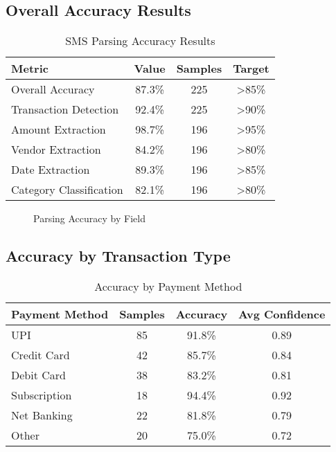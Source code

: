 \documentclass[11pt,a4paper]{report}
\begin{document}
\subsection{Overall Accuracy Results}

\begin{table}[H]
\centering
\caption{SMS Parsing Accuracy Results}
\begin{tabular}{|l|c|c|c|}
\hline
\textbf{Metric} & \textbf{Value} & \textbf{Samples} & \textbf{Target} \\
\hline
Overall Accuracy & 87.3\% & 225 & >85\% \\
Transaction Detection & 92.4\% & 225 & >90\% \\
Amount Extraction & 98.7\% & 196 & >95\% \\
Vendor Extraction & 84.2\% & 196 & >80\% \\
Date Extraction & 89.3\% & 196 & >85\% \\
Category Classification & 82.1\% & 196 & >80\% \\
\hline
\end{tabular}
\end{table}

\begin{figure}[htbp]
    \centering
    \caption{Parsing Accuracy by Field}
    \label{fig:accuracy_chart}
\end{figure}

\subsection{Accuracy by Transaction Type}

\begin{table}[H]
\centering
\caption{Accuracy by Payment Method}
\begin{tabular}{|l|c|c|c|}
\hline
\textbf{Payment Method} & \textbf{Samples} & \textbf{Accuracy} & \textbf{Avg Confidence} \\
\hline
UPI & 85 & 91.8\% & 0.89 \\
Credit Card & 42 & 85.7\% & 0.84 \\
Debit Card & 38 & 83.2\% & 0.81 \\
Subscription & 18 & 94.4\% & 0.92 \\
Net Banking & 22 & 81.8\% & 0.79 \\
Other & 20 & 75.0\% & 0.72 \\
\hline
\end{tabular}
\end{table}
\end{document}
